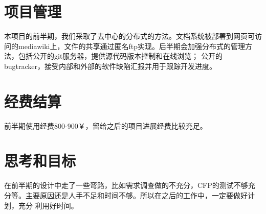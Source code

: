\section{项目管理}

本项目的前半期，我们采取了去中心的分布式的方法。文档系统被部署到网页可访
问的mediawiki上，文件的共享通过匿名ftp实现。后半期会加强分布式的管理方法，包括公开的git服务器，提供源代码版本控制和在线浏览；
公开的bugtracker，接受内部和外部的软件缺陷汇报并用于跟踪开发进度。

\section{经费结算}

前半期使用经费800-900￥，留给之后的项目进展经费比较充足。

\section{思考和目标}

在前半期的设计中走了一些弯路，比如需求调查做的不充分，CFP的测试不够充
分等。主要原因还是人手不足和时间不够。所以在之后的工作中，一定要做好计划，充分
利用好时间。
